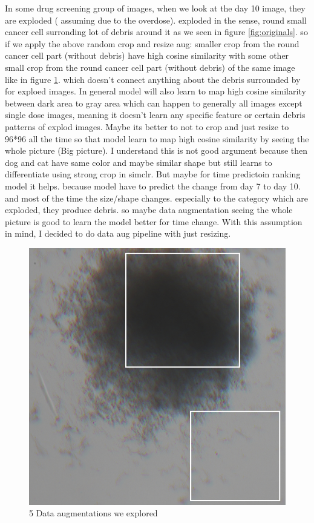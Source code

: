  In some drug screening group of images, when we look at the day 10 image, they are exploded ( assuming due to the overdose). exploded in the sense, round 
 small cancer cell surronding lot of debris around it as we seen in figure \ref{fig:originals}. so if we apply the above random crop and resize aug: smaller crop from the round cancer cell part (without 
 debris) have high cosine similarity with some other small crop from the round cancer cell part (without debris) of the same image like in figure \ref{fig:expo}. which doesn't connect anything
  about the debris surrounded by for exploed images. In general model will also learn to map high cosine similarity between dark area to gray area which can happen
to generally all images except single dose images, meaning it doesn't learn any specific feature or certain debris patterns of explod images.
Maybe its better to not to crop and just resize to 96*96 all the time so that model learn to map high cosine similarity by seeing the whole picture (Big picture).
I understand this is not good argument because then dog and cat have same color and maybe similar shape but still learns to differentiate using strong crop in simclr.
But maybe for time predictoin ranking model it helps. because model have to predict the change from day 7 to day 10. and most of the time the size/shape changes. 
especially to the category which are exploded, they produce debris. so maybe data augmentation seeing the whole picture is good to learn the model better for time 
change.  With this assumption in mind, I decided to do data aug pipeline with just resizing.

\begin{figure}[H]
  \centering
  \includegraphics[scale=0.6]{figures/expo.png} 
  \caption{5 Data augmentations we explored}
  \label{fig:expo}
\end{figure}

